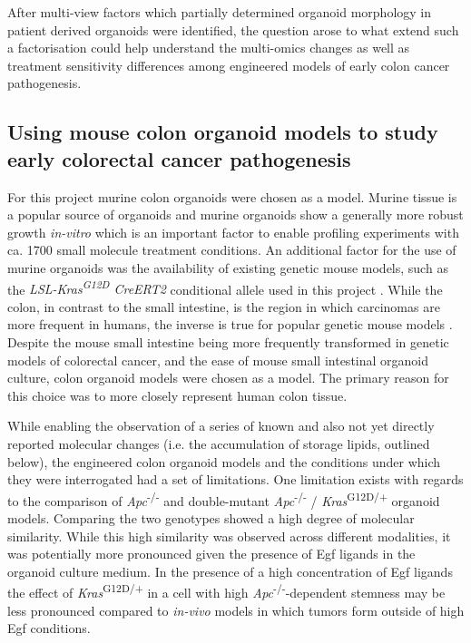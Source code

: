 \begin{flushleft}
After multi-view factors which partially determined organoid morphology in patient derived organoids were identified, the question arose to what extend such a factorisation could help understand the multi-omics changes as well as treatment sensitivity differences among engineered models of early colon cancer pathogenesis.

\subsection{Using mouse colon organoid models to study early colorectal cancer pathogenesis}

For this project murine colon organoids were chosen as a model. Murine tissue is a popular source of organoids \parencite{satoSingleLgr5Stem2009} and murine organoids show a generally more robust growth \textit{in-vitro} which is an important factor to enable profiling experiments with ca. 1700 small molecule treatment conditions. An additional factor for the use of murine organoids was the availability of existing genetic mouse models, such as the \textit{LSL-Kras\textsuperscript{G12D} CreERT2} conditional allele used in this project \parencite{jacksonAnalysisLungTumor2001}. While the colon, in contrast to the small intestine, is the region in which carcinomas are more frequent in humans, the inverse is true for popular genetic mouse models \parencite{luoMutatedKrasAsp12Promotes2009}. Despite the mouse small intestine being more frequently transformed in genetic models of colorectal cancer, and the ease of mouse small intestinal organoid culture, colon organoid models were chosen as a model. The primary reason for this choice was to more closely represent human colon tissue. 
\smallbreak

While enabling the observation of a series of known and also not yet directly reported molecular changes (i.e. the accumulation of storage lipids, outlined below), the engineered colon organoid models and the conditions under which they were interrogated had a set of limitations. One limitation exists with regards to the comparison of \textit{Apc}\textsuperscript{-/-} and double-mutant \textit{Apc}\textsuperscript{-/-} / \textit{Kras}\textsuperscript{G12D/+} organoid models. Comparing the two genotypes showed a high degree of molecular similarity. While this high similarity was observed across different modalities, it was potentially more pronounced given the presence of Egf ligands in the organoid culture medium. In the presence of a high concentration of Egf ligands the effect of \textit{Kras}\textsuperscript{G12D/+} in a cell with high \textit{Apc}\textsuperscript{-/-}-dependent stemness may be less pronounced compared to \textit{in-vivo} models in which tumors form outside of high Egf conditions. 


\end{flushleft}
